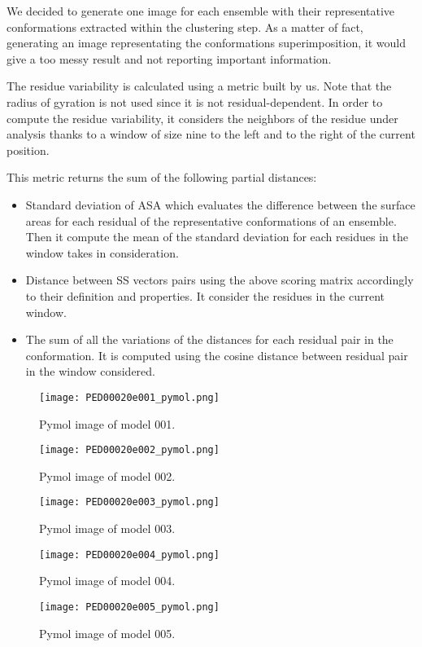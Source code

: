 We decided to generate one image for each ensemble with their representative conformations extracted within the clustering step.
As a matter of fact, generating an image representating the conformations superimposition, it would give a too messy result and not reporting important information.

\medskip
The residue variability is calculated using a metric built by us. Note that the radius of gyration is not used since it is not residual-dependent.
In order to compute the residue variability, it considers the neighbors of the residue under analysis thanks to a window of size nine to the left and to the right of the current position.

This metric returns the sum of the following partial distances:
\begin{itemize}
\item Standard deviation of ASA which evaluates the difference between the surface areas for each residual of the representative conformations of an ensemble. Then it compute the mean of the standard deviation for each residues in the window takes in consideration.
\item Distance between SS vectors pairs using the above scoring matrix accordingly to their definition and properties. It consider the residues in the current window.
\item The sum of all the variations of the distances for each residual pair in the conformation. It is computed using the cosine distance between residual pair in the window considered. 
\end{itemize}

\begin{figure}[H]
	\begin{minipage}[b]{0.97\textwidth}
		\centering
		\texttt{[image: PED00020e001\_pymol.png]}
		\caption{Pymol image of model 001.}
		\label{model001p}
	\end{minipage}
	\begin{minipage}[b]{0.97\textwidth}
		\centering
		\texttt{[image: PED00020e002\_pymol.png]}
		\caption{Pymol image of model 002.}
		\label{model002p}
	\end{minipage}
\end{figure}
\begin{figure}[H]
	\begin{minipage}[b]{0.99\textwidth}
		\centering
		\texttt{[image: PED00020e003\_pymol.png]}
		\caption{Pymol image of model 003.}
		\label{model003p}
	\end{minipage}
	\begin{minipage}[b]{0.99\textwidth}
		\centering
		\texttt{[image: PED00020e004\_pymol.png]}
		\caption{Pymol image of model 004.}
		\label{model004p}
	\end{minipage}
	\begin{minipage}[b]{0.99\textwidth}
		\centering
		\texttt{[image: PED00020e005\_pymol.png]}
		\caption{Pymol image of model 005.}
		\label{model005p}
	\end{minipage}
\end{figure}

